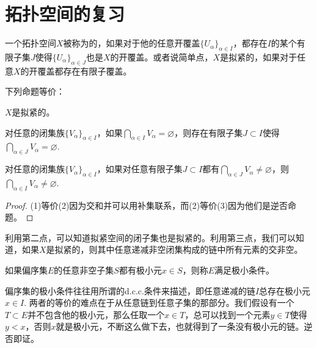 \appendix
\renewcommand{\thepara}{\Alph{chapter}.\arabic{para}}

\chapter{拓扑空间的复习}

\para 一个拓扑空间$X$被称为的，如果对于他的任意开覆盖$\{U_\alpha\}_{\alpha\in I}$，都存在$I$的某个有限子集$J$使得$\{U_\alpha\}_{\alpha\in J}$也是$X$的开覆盖。或者说简单点，$X$是拟紧的，如果对于任意$X$的开覆盖都存在有限子覆盖。\endpara



\begin{pro}下列命题等价：
\begin{compactenum}[~~~(1)]
\item $X$是拟紧的。
\item 对任意的闭集族$\{V_\alpha\}_{\alpha\in I}$，如果$\bigcap_{\alpha\in I} V_\alpha=\varnothing$，则存在有限子集$J\subset I$使得$\bigcap_{\alpha\in J} V_\alpha=\varnothing$.
\item 对任意的闭集族$\{V_\alpha\}_{\alpha\in I}$，如果对任意有限子集$J\subset I$都有$\bigcap_{\alpha\in J} V_\alpha\neq\varnothing$，则$\bigcap_{\alpha\in I} V_\alpha\neq\varnothing$.
\end{compactenum}
\end{pro}

\begin{proof} (1)等价(2)因为交和并可以用补集联系，而(2)等价(3)因为他们是逆否命题。
\end{proof}

利用第二点，可以知道拟紧空间的闭子集也是拟紧的。利用第三点，我们可以知道，如果$X$是拟紧的，则其中任意递减非空闭集构成的链中所有元素的交非空。

\para 如果偏序集$E$的任意非空子集$S$都有极小元$x\in S$，则称$E$满足极小条件。\endpara

偏序集的极小条件往往用所谓的d.c.c.条件来描述，即任意递减的链$I$总存在极小元$x\in I$. 两者的等价的难点在于从任意链到任意子集的那部分。我们假设有一个$T\subset E$并不包含他的极小元，那么任取一个$x\in T$，总可以找到一个元素$y\in T$使得$y<x$，否则$x$就是极小元，不断这么做下去，也就得到了一条没有极小元的链。逆否即证。

